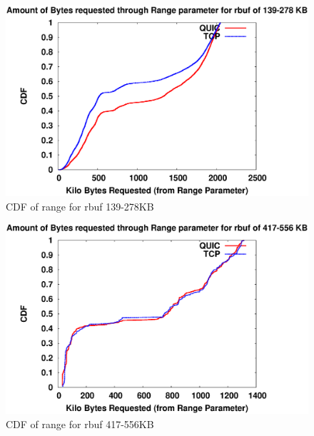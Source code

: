 \begin{figure}[!ht]
    \centering
    \includegraphics[width=0.9\linewidth]{img/CDF/plot_range_284734}
    \caption{CDF of range for rbuf 139-278KB}
    \label{fig:rabuf761856}
\end{figure}
\begin{figure}[!ht]
    \centering
    \includegraphics[width=0.9\linewidth]{img/CDF/plot_range_569468}
    \caption{CDF of range for rbuf 417-556KB}
    \label{fig:rabuf761}
\end{figure}

